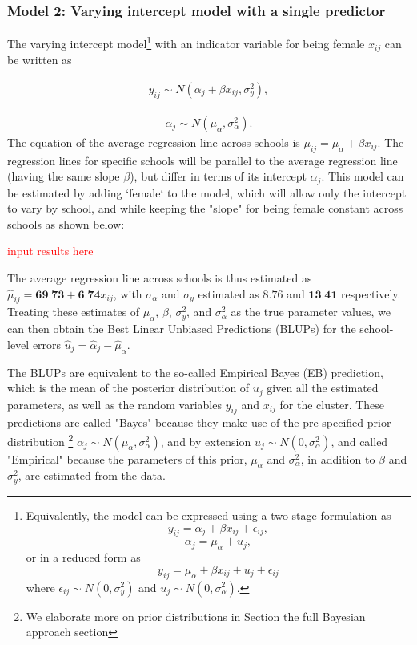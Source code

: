 \subsubsection*{Model 2: Varying intercept model with a single predictor}
The varying intercept model\footnote{Equivalently, the model can be expressed using a two-stage formulation as $$y_{ij} = \alpha_j + \beta x_{ij} +\epsilon_{ij},$$ $$\alpha_j = \mu_\alpha + u_j,$$ or in a reduced form as $$y_{ij} = \mu_\alpha + \beta x_{ij} + u_j + \epsilon_{ij}$$ where $\epsilon_{ij} \sim N(0, \sigma_{y}^{2})$ and $u_{j}\sim N(0, \sigma_{\alpha}^{2})$.} with an indicator variable for being female $x_{ij}$ can be written as

\begin{align}
	y_{ij} \sim N(\alpha_{j}+\beta x_{ij} , \sigma_{y}^{2}),
\end{align}

\begin{align}
	\alpha_{j}\sim N(\mu_{\alpha}, \sigma_{\alpha}^{2}).
\end{align}
The equation of the average regression line across schools is $\mu_{ij}=\mu_{\alpha}+\beta x_{ij}$. The regression lines for specific schools will be parallel to the average regression line (having the same slope $\beta$), but differ in terms of its intercept $\alpha_{j}$. This model can be estimated by adding `female` to the model, which will allow only the intercept to vary by school, and while keeping the "slope" for being female constant across schools as shown below:


\textcolor{red}{input results here}

The average regression line across schools is thus estimated as $\hat{\mu}_{ij} = \textbf{69.73} + \textbf{6.74} x_{ij}$, with $\sigma_\alpha$ and $\sigma_y$ estimated as $8.76$ and $\textbf{13.41}$ respectively.  Treating these estimates of $\mu_\alpha$, $\beta$, $\sigma^2_{y}$, and $\sigma^2_{\alpha}$ as the true parameter values, we can then obtain the Best Linear Unbiased Predictions (BLUPs) for the school-level errors $\hat{u}_j = \hat{\alpha}_{j} - \hat{\mu}_{\alpha}$. 

The BLUPs are equivalent to the so-called Empirical Bayes (EB) prediction, which is the mean of the posterior distribution of $u_{j}$ given all the estimated parameters, as well as the random variables $y_{ij}$ and $x_{ij}$ for the cluster.  These predictions are called "Bayes" because they make use of the pre-specified prior distribution \footnote{We elaborate more on prior distributions in Section the full Bayesian approach section} $\alpha_j \sim N(\mu_\alpha, \sigma^2_\alpha)$, and by extension $u_j \sim N(0, \sigma^2_\alpha)$, and called "Empirical" because the parameters of this prior, $\mu_\alpha$ and $\sigma^2_{\alpha}$, in addition to $\beta$ and $\sigma^2_{y}$, are estimated from the data.

